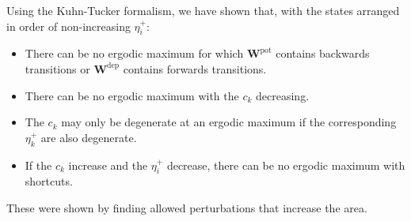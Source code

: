 \documentclass{article} %
\newcommand{\W}{\mathbf{W}}
\newcommand{\pot}{^{\text{pot}}}
\newcommand{\dep}{^{\text{dep}}}
\newcommand{\potdep}{^{\text{pot/dep}}}
\begin{document}
Using the Kuhn-Tucker formalism, we have shown that,
with the states arranged in order of non-increasing $\eta^+_i$:
%
\begin{itemize}
  \item There can be no ergodic maximum for which $\W\pot $ contains backwards transitions or $\W\dep $ contains forwards transitions.
  \item There can be no ergodic maximum with the $c_k$ decreasing.
  \item The $c_k$ may only be degenerate at an ergodic maximum if the corresponding $\eta^+_k$ are also degenerate.
  \item If the $c_k$ increase and the $\eta^+_i$ decrease, there can be no ergodic maximum with shortcuts.
\end{itemize}
%
These were shown by finding allowed perturbations that increase the area.

%
\end{document}
